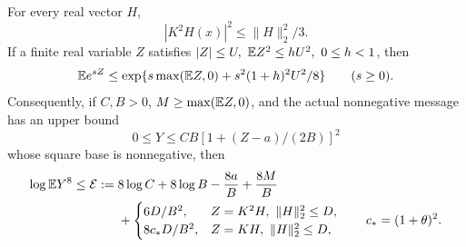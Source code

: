 \begin{lemma}
\label{lem:short-one:exponential}
For every real vector \(H\),
\begin{equation}\label{eq:short-one:two-row}
 |K^2H(x)|^2\le\|H\|_2^2/3.
\end{equation}
If a finite real variable \(Z\) satisfies
\(|Z|\le U,\ \mathbb E Z^2\le hU^2,\ 0\le h<1\), then
\begin{equation}\label{eq:short-one:positive-mgf}
 \mathbb E e^{sZ}\le
 \exp\{s\max(\mathbb E Z,0)+s^2(1+h)^2U^2/8\}\qquad(s\ge0).
\end{equation}
Consequently, if \(C,B>0\), \(M\ge\max(\mathbb E Z,0)\), and the actual
nonnegative message has an upper bound
\begin{equation}\label{eq:short-one:actual-square}
 0\le Y\le CB[1+(Z-a)/(2B)]^2
\end{equation}
whose square base is nonnegative, then
\begin{equation}\label{eq:short-one:paid-exponent}
\begin{aligned}
 \log\mathbb E Y^8\le\mathcal E:={}&
 8\log C+8\log B-\frac{8a}{B}+\frac{8M}{B}\\
 &+\begin{cases}
       6D/B^2,&Z=K^2H,\ \|H\|_2^2\le D,\\
       8c_*D/B^2,&Z=KH,\ \|H\|_2^2\le D,
   \end{cases}
 \qquad c_*=(1+\theta)^2 .
\end{aligned}
\end{equation}
\end{lemma}
